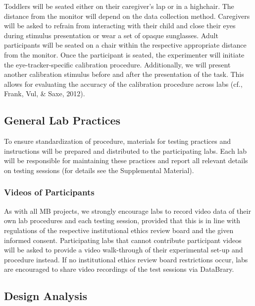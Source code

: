 \documentclass[
  man,floatsintext]{apa6}
\begin{document}
Toddlers will be seated either on their caregiver's lap or in a highchair. The distance from the monitor will depend on the data collection method. Caregivers will be asked to refrain from interacting with their child and close their eyes during stimulus presentation or wear a set of opaque sunglasses. Adult participants will be seated on a chair within the respective appropriate distance from the monitor. Once the participant is seated, the experimenter will initiate the eye-tracker-specific calibration procedure. Additionally, we will present another calibration stimulus before and after the presentation of the task. This allows for evaluating the accuracy of the calibration procedure across labs (cf., Frank, Vul, \& Saxe, 2012).

\subsection{General Lab Practices}\label{general-lab-practices}

To ensure standardization of procedure, materials for testing practices and instructions will be prepared and distributed to the participating labs. Each lab will be responsible for maintaining these practices and report all relevant details on testing sessions (for details see the Supplemental Material).

\subsubsection{Videos of Participants}\label{videos-of-participants}

As with all MB projects, we strongly encourage labs to record video data of their own lab procedures and each testing session, provided that this is in line with regulations of the respective institutional ethics review board and the given informed consent. Participating labs that cannot contribute participant videos will be asked to provide a video walk-through of their experimental set-up and procedure instead. If no institutional ethics review board restrictions occur, labs are encouraged to share video recordings of the test sessions via DataBrary.

\subsection{Design Analysis}\label{design-analysis}
\end{document}

